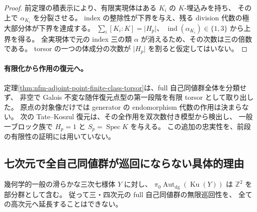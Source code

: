 \begin{proof}
前定理の積表示により、有限実現体はある $K_i$ の $K$-埋込みを持ち、
その上で $\alpha_{K_i}$ を分裂させる。
index の整除性が下界を与え、残る division 代数の極大部分体が下界を達成する。
$\sum_i[K_i:K]=\lvert H_p\rvert$、
$\operatorname{ind}(\alpha_{K_i})\in\{1,3\}$ から上界を得る。
全実現体で元の index 三の類 $\alpha$ が消えるため、その次数は三の倍数である。
torsor の一つの体成分の次数が $\lvert H_p\rvert$ を割ると仮定してはいない。
\end{proof}

\paragraph{有限化から作用の復元へ。}
定理\ref{thm:nfm-adjoint-point-finite-class-torsor}は、full 自己同値群全体を分類せず、
非空で Galois 不変な随伴復元点型の第一段階を有限 torsor として取り出した。
原点の対象像だけでは generator の endomorphism 代数の作用は決まらない。
次の Tate--Koszul 復元は、その全作用を双次数付き模型から検出し、
一般一ブロック族で $H_p=1$ と $S_p=\operatorname{Spec}K$ を与える。
この追加の忠実性を、前段の有限性の証明には用いていない。





\subsection{七次元で全自己同値群が巡回にならない具体的理由}

\begin{proposition}[一般三次七様体の非巡回自己同値]
\label{prop:nfm-sevenfold-noncyclic-aut}
幾何学的一般の滑らかな三次七様体 $Y$ に対し、
$\pi_0\operatorname{Aut}_{\mathrm{dg}}(\operatorname{Ku}(Y))$
は $\mathbb Z^2$ を部分群として含む。
従って三・四次元の full 自己同値群の無限巡回性を、
全ての高次元へ延長することはできない。
\end{proposition}

